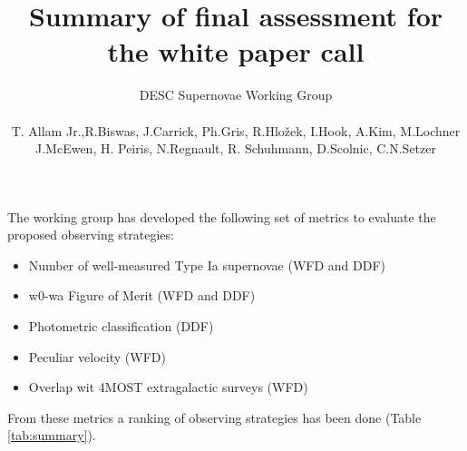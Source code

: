 \documentclass[a4paper,10pt]{article}
\title{Summary of final assessment for the white paper call}
\author{DESC Supernovae Working Group \\ 
\\
T. Allam Jr.,R.Biswas, J.Carrick, Ph.Gris, R.Hlo\v{z}ek, I.Hook, A.Kim, M.Lochner \\ J.McEwen, H. Peiris, N.Regnault, R. Schuhmann, D.Scolnic, C.N.Setzer}
\date{}
\begin{document}
\maketitle

\newpage

The working group has developed the following set of metrics to evaluate the proposed observing strategies:
\begin{itemize}
\item Number of well-measured Type Ia supernovae (WFD and DDF)
\item w0-wa Figure of Merit (WFD and DDF)
\item Photometric classification (DDF)
\item Peculiar velocity (WFD)
\item Overlap wit 4MOST extragalactic surveys (WFD)
\end{itemize}

From these metrics a ranking of observing strategies has been done (Table \ref{tab:summary}).
\end{document}
